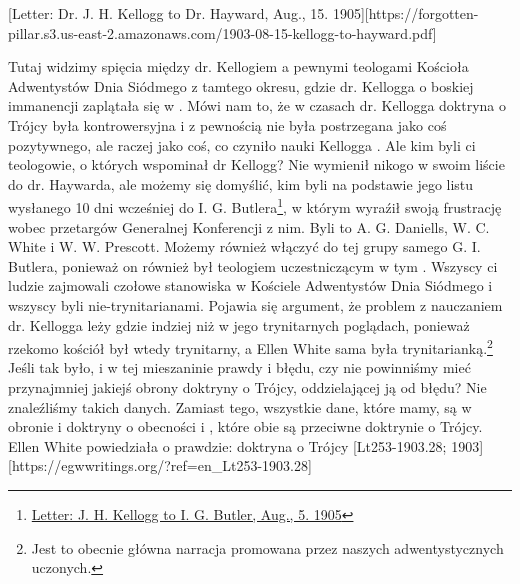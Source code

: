 [Letter: Dr. J. H. Kellogg to Dr. Hayward, Aug., 15. 1905][https://forgotten-pillar.s3.us-east-2.amazonaws.com/1903-08-15-kellogg-to-hayward.pdf]

Tutaj widzimy spięcia między dr. Kellogiem a pewnymi teologami Kościoła Adwentystów Dnia Siódmego z tamtego okresu, gdzie  dr. Kellogga o boskiej immanencji zaplątała się w . Mówi nam to, że w czasach dr. Kellogga doktryna o Trójcy była kontrowersyjna i z pewnością nie była postrzegana jako coś pozytywnego, ale raczej jako coś, co czyniło nauki Kellogga . Ale kim byli ci teologowie, o których wspominał dr Kellogg? Nie wymienił nikogo w swoim liście do dr. Haywarda, ale możemy się domyślić, kim byli  na podstawie jego listu wysłanego 10 dni wcześniej do I. G. Butlera\footnote{\href{https://forgotten-pillar.s3.us-east-2.amazonaws.com/1905-08-05-kellogg-butler.pdf}{Letter: J. H. Kellogg to I. G. Butler, Aug., 5. 1905}}, w którym wyraźił swoją frustrację wobec przetargów Generalnej Konferencji z nim. Byli to A. G. Daniells, W. C. White i W. W. Prescott. Możemy również włączyć do tej grupy samego G. I. Butlera, ponieważ on również był teologiem uczestniczącym w tym . Wszyscy ci ludzie zajmowali czołowe stanowiska w Kościele Adwentystów Dnia Siódmego i wszyscy byli nie-trynitarianami. Pojawia się argument, że problem z nauczaniem dr. Kellogga leży gdzie indziej niż w jego trynitarnych poglądach, ponieważ rzekomo kościół był wtedy trynitarny, a Ellen White sama była trynitarianką.\footnote{Jest to obecnie główna narracja promowana przez naszych adwentystycznych uczonych.} Jeśli tak było, i w tej mieszaninie prawdy i błędu, czy nie powinniśmy mieć przynajmniej jakiejś obrony doktryny o Trójcy, oddzielającej ją od błędu? Nie znaleźliśmy takich danych. Zamiast tego, wszystkie dane, które mamy, są w obronie  i doktryny o obecności i , które obie są przeciwne doktrynie o Trójcy. Ellen White powiedziała o prawdzie: doktryna o Trójcy [Lt253-1903.28; 1903][https://egwwritings.org/?ref=en\_Lt253-1903.28]

